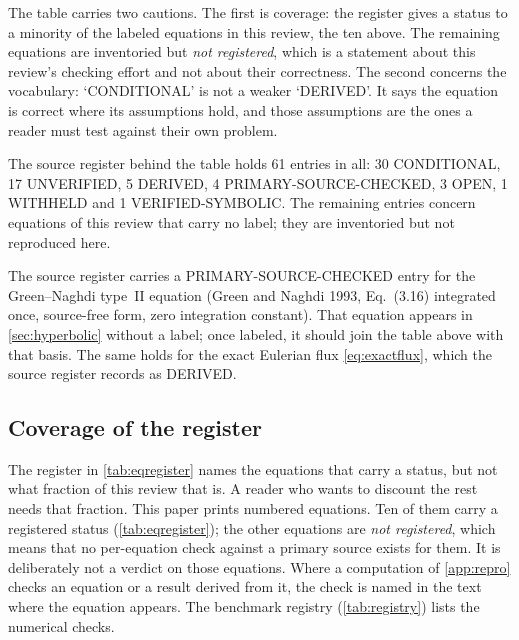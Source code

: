The table carries two cautions. The first is coverage: the register gives a status to a minority of the
labeled equations in this review, the ten above. The remaining equations are inventoried but
\emph{not registered}, which is a statement about this review's checking effort and not about their
correctness. The second concerns the vocabulary: `CONDITIONAL' is not a weaker `DERIVED'. It says the
equation is correct where its assumptions hold, and those assumptions are the ones a reader must test
against their own problem.

The source register behind the table holds 61 entries in all: 30 CONDITIONAL, 17
UNVERIFIED, 5 DERIVED, 4 PRIMARY-SOURCE-CHECKED, 3 OPEN, 1 WITHHELD and 1 VERIFIED-SYMBOLIC. The remaining
entries concern equations of this review that carry no label; they are inventoried but not reproduced
here.

The source register carries a PRIMARY-SOURCE-CHECKED entry for the Green--Naghdi type~II equation (Green
and Naghdi 1993, Eq.~(3.16) integrated once, source-free form, zero integration constant). That equation
appears in \cref{sec:hyperbolic} without a label; once labeled, it should join the table above with that
basis. The same holds for the exact Eulerian flux \eqref{eq:exactflux}, which the source register
records as DERIVED.

\subsection{Coverage of the register}\label{sec:eqcoverage}

The register in \cref{tab:eqregister} names the equations that carry a status, but not what fraction of this review that is. A reader who wants to discount the rest needs that fraction. This paper prints \totaleqs{} numbered equations. Ten of them carry a registered status (\cref{tab:eqregister}); the other equations are \emph{not registered}, which means that no per-equation check against a primary source exists for them. It is deliberately not a verdict on those equations. Where a computation of \cref{app:repro} checks an equation or a result derived from it, the check is named in the text where the equation appears. The benchmark registry (\cref{tab:registry}) lists the numerical checks.
